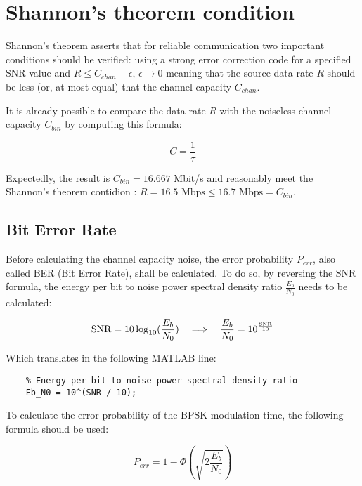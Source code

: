 \vspace{40px} \section{Shannon's theorem condition}
Shannon's theorem asserts that for reliable communication two important conditions should be verified: using a strong error correction code for a specified SNR value and $R \leq C_{chan} - \epsilon,\, \epsilon\to0$ meaning that the source data rate $R$ should be less (or, at most equal) that the channel capacity $C_{chan}$.

It is already possible to compare the data rate $R$ with the noiseless channel capacity $C_{bin}$ by computing this formula:

\begin{equation*}
    C = \frac{1}{\tau}
\end{equation*}

\noindent Expectedly, the result is $C_{bin} = 16.667$ Mbit/s and reasonably meet the Shannon's theorem contidion : $ R = 16.5 \text{ Mbps} \leq 16.7 \text{ Mbps} = C_{bin}$.


\subsection{Bit Error Rate}
Before calculating the channel capacity noise, the error probability $P_{err}$, also called BER (Bit Error Rate), shall be calculated. To do so, by reversing the SNR formula, the energy per bit to noise power spectral density ratio $\frac{E_b}{N_0}$ needs to be calculated:

\begin{equation*}
    \text{SNR} = 10\log_{10}(\frac{E_b}{N_0}) \hspace{10px} \Longrightarrow \hspace{10px} \frac{E_b}{N_0} = 10^{\frac{\text{SNR}}{10}}
\end{equation*}

\noindent Which translates in the following MATLAB line:

\begin{lstlisting}
    % Energy per bit to noise power spectral density ratio
    Eb_N0 = 10^(SNR / 10);
\end{lstlisting}

\noindent To calculate the error probability of the BPSK modulation time, the following formula should be used:

\begin{equation*}
    P_{err} = 1-\Phi\left( \sqrt{2\frac{E_b}{N_0}} \right)
\end{equation*}

